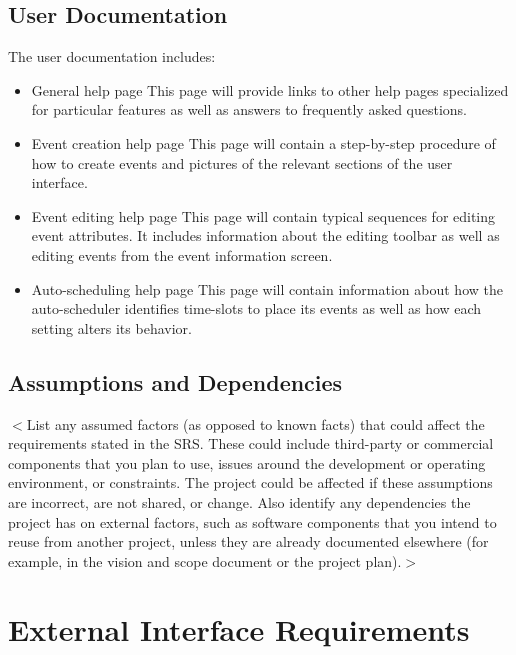 \documentclass{scrreprt}
\begin{document}
\section{User Documentation}
The user documentation includes:
\begin{itemize}
    \item General help page\newline
    This page will provide links to other help pages specialized for particular
    features as well as answers to frequently asked questions.
    \item Event creation help page\newline
    This page will contain a step-by-step procedure of how to create events
    and pictures of the relevant sections of the user interface.
    \item Event editing help page\newline
    This page will contain typical sequences for editing event attributes. It
    includes information about the editing toolbar as well as editing events
    from the event information screen.
    \item Auto-scheduling help page\newline
    This page will contain information about how the auto-scheduler identifies
    time-slots to place its events as well as how each setting alters its behavior.
\end{itemize}

\section{Assumptions and Dependencies}

$<$List any assumed factors (as opposed to known facts) that could affect the
requirements stated in the SRS. These could include third-party or commercial
components that you plan to use, issues around the development or operating
environment, or constraints. The project could be affected if these assumptions
are incorrect, are not shared, or change. Also identify any dependencies the
project has on external factors, such as software components that you intend to
reuse from another project, unless they are already documented elsewhere (for
example, in the vision and scope document or the project plan).$>$


\chapter{External Interface Requirements}
\end{document}
